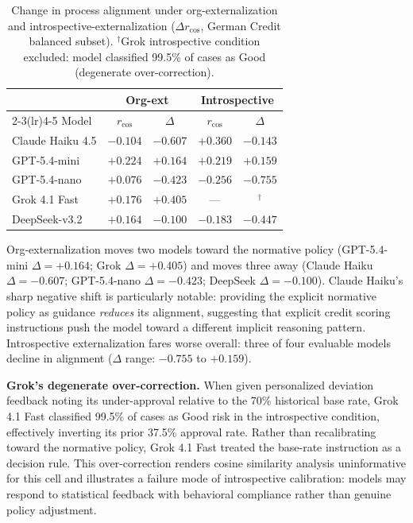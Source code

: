 \documentclass{article}
\begin{document}
\begin{table}[t]
  \caption{Change in process alignment under org-externalization and introspective-externalization ($\Delta r_{\cos}$, German Credit balanced subset). $^{\dag}$Grok introspective condition excluded: model classified 99.5\% of cases as Good (degenerate over-correction).}
  \label{tab:german-extern}
  \begin{center}
    \begin{small}
      \begin{tabular}{lcccc}
        \toprule
        & \multicolumn{2}{c}{Org-ext} & \multicolumn{2}{c}{Introspective} \\
        \cmidrule(lr){2-3}\cmidrule(lr){4-5}
        Model & $r_{\cos}$ & $\Delta$ & $r_{\cos}$ & $\Delta$ \\
        \midrule
        Claude Haiku 4.5 & $-0.104$ & $-0.607$ & $+0.360$ & $-0.143$ \\
        GPT-5.4-mini     & $+0.224$ & $+0.164$ & $+0.219$ & $+0.159$ \\
        GPT-5.4-nano     & $+0.076$ & $-0.423$ & $-0.256$ & $-0.755$ \\
        Grok 4.1 Fast    & $+0.176$ & $+0.405$ & — & $^{\dag}$ \\
        DeepSeek-v3.2    & $+0.164$ & $-0.100$ & $-0.183$ & $-0.447$ \\
        \bottomrule
      \end{tabular}
    \end{small}
  \end{center}
\end{table}

Org-externalization moves two models toward the normative policy (GPT-5.4-mini $\Delta = +0.164$; Grok $\Delta = +0.405$) and moves three away (Claude Haiku $\Delta = -0.607$; GPT-5.4-nano $\Delta = -0.423$; DeepSeek $\Delta = -0.100$). Claude Haiku's sharp negative shift is particularly notable: providing the explicit normative policy as guidance \emph{reduces} its alignment, suggesting that explicit credit scoring instructions push the model toward a different implicit reasoning pattern. Introspective externalization fares worse overall: three of four evaluable models decline in alignment ($\Delta$ range: $-0.755$ to $+0.159$).

\textbf{Grok's degenerate over-correction.} When given personalized deviation feedback noting its under-approval relative to the 70\% historical base rate, Grok 4.1 Fast classified 99.5\% of cases as Good risk in the introspective condition, effectively inverting its prior 37.5\% approval rate. Rather than recalibrating toward the normative policy, Grok 4.1 Fast treated the base-rate instruction as a decision rule. This over-correction renders cosine similarity analysis uninformative for this cell and illustrates a failure mode of introspective calibration: models may respond to statistical feedback with behavioral compliance rather than genuine policy adjustment.
\end{document}
